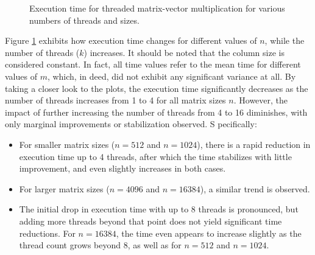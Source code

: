 \documentclass[acmlarge]{acmart}
\begin{document}
\begin{figure}[h]
  \centering
  \caption{Execution time for threaded matrix-vector multiplication for various numbers of threads and sizes.}
  \label{fig:multiplication-times-dif-n}
\end{figure}

Figure \ref{fig:multiplication-times-dif-n} exhibits how execution time changes for different
values of $n$, while the number of threads ($k$) increases.
It should be noted that the column size is considered constant.
In fact, all time values refer to the mean time for different values of $m$, which, in deed, did not exhibit any
significant variance at all.
By taking a closer look to the plots, the execution time significantly decreases as the number of threads increases from 1 to 4 for all matrix sizes \( n \).
However, the impact of further increasing the number of threads from 4 to 16 diminishes, with only marginal improvements or stabilization observed. S
pecifically:

\begin{itemize}
  \item For smaller matrix sizes (\( n = 512 \) and \( n = 1024 \)), there is a rapid reduction in execution time up
        to 4 threads, after which the time stabilizes with little improvement, and even slightly increases in both cases.
  \item For larger matrix sizes (\( n = 4096 \) and \( n = 16384 \)), a similar trend is observed.
  \item The initial drop in execution time with up to 8 threads is pronounced, but adding more threads beyond that
        point does not yield significant time reductions. For \( n = 16384 \), the time even appears to increase slightly
        as the thread count grows beyond 8, as well as for $n=512$ and $n=1024$.
\end{itemize}
\end{document}
